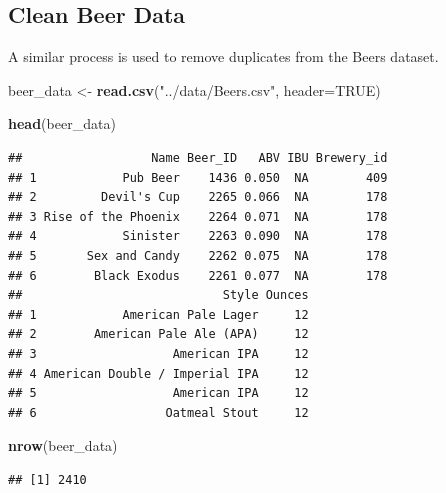 \documentclass[]{article}
\newenvironment{Shaded}{\begin{snugshade}}{\end{snugshade}}
\newcommand{\KeywordTok}[1]{\textcolor[rgb]{0.13,0.29,0.53}{\textbf{#1}}}
\newcommand{\DataTypeTok}[1]{\textcolor[rgb]{0.13,0.29,0.53}{#1}}
\newcommand{\StringTok}[1]{\textcolor[rgb]{0.31,0.60,0.02}{#1}}
\newcommand{\OtherTok}[1]{\textcolor[rgb]{0.56,0.35,0.01}{#1}}
\newcommand{\NormalTok}[1]{#1}
\begin{document}
\subsection{Clean Beer Data}\label{clean-beer-data}

A similar process is used to remove duplicates from the Beers dataset.

\begin{Shaded}
\begin{Highlighting}[]
\NormalTok{beer_data <-}\StringTok{ }\KeywordTok{read.csv}\NormalTok{(}\StringTok{"../data/Beers.csv"}\NormalTok{, }\DataTypeTok{header=}\OtherTok{TRUE}\NormalTok{)}

\KeywordTok{head}\NormalTok{(beer_data)}
\end{Highlighting}
\end{Shaded}

\begin{verbatim}
##                  Name Beer_ID   ABV IBU Brewery_id
## 1            Pub Beer    1436 0.050  NA        409
## 2         Devil's Cup    2265 0.066  NA        178
## 3 Rise of the Phoenix    2264 0.071  NA        178
## 4            Sinister    2263 0.090  NA        178
## 5       Sex and Candy    2262 0.075  NA        178
## 6        Black Exodus    2261 0.077  NA        178
##                            Style Ounces
## 1            American Pale Lager     12
## 2        American Pale Ale (APA)     12
## 3                   American IPA     12
## 4 American Double / Imperial IPA     12
## 5                   American IPA     12
## 6                  Oatmeal Stout     12
\end{verbatim}

\begin{Shaded}
\begin{Highlighting}[]
\KeywordTok{nrow}\NormalTok{(beer_data)}
\end{Highlighting}
\end{Shaded}

\begin{verbatim}
## [1] 2410
\end{verbatim}
\end{document}

